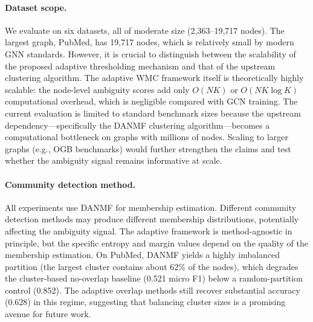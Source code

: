 \documentclass[pdflatex,sn-mathphys-num]{sn-jnl}%
\theoremstyle{thmstyleone}%
\theoremstyle{thmstyletwo}%
\theoremstyle{thmstylethree}%
\begin{document}
\paragraph{Dataset scope.}
We evaluate on six datasets, all of moderate size (2,363--19,717 nodes). 
The largest graph, PubMed, has 19,717 nodes, which is relatively small by modern GNN standards. 
However, it is crucial to distinguish between the scalability of the proposed adaptive thresholding mechanism and that of the upstream clustering algorithm. 
The adaptive WMC framework itself is theoretically highly scalable: the node-level ambiguity scores add only $O(NK)$ or $O(NK \log K)$ computational overhead, which is negligible compared with GCN training. 
The current evaluation is limited to standard benchmark sizes because the upstream dependency—specifically the DANMF clustering algorithm—becomes a computational bottleneck on graphs with millions of nodes. 
Scaling to larger graphs (e.g., OGB benchmarks) would further strengthen the claims and test whether the ambiguity signal remains informative at scale.

\paragraph{Community detection method.}
All experiments use DANMF for membership estimation. 
Different community detection methods may produce different membership distributions, potentially affecting the ambiguity signal. 
The adaptive framework is method-agnostic in principle, but the specific entropy and margin values depend on the quality of the membership estimation. 
On PubMed, DANMF yields a highly imbalanced partition (the largest cluster contains about 62\% of the nodes), which degrades the cluster-based no-overlap baseline (0.521 micro F1) below a random-partition control (0.852). 
The adaptive overlap methods still recover substantial accuracy (0.628) in this regime, suggesting that balancing cluster sizes is a promising avenue for future work.

\end{document}

